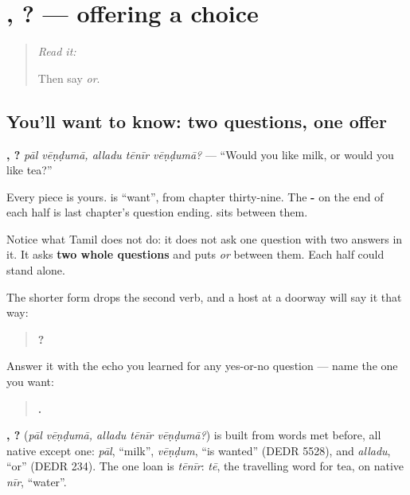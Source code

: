 \section[\texorpdfstring{\ta{பால்} \ta{வேண்டுமா} … (pāl vēṇḍumā …)}{பால் வேண்டுமா … (pāl vēṇḍumā …)}]{ ,   ? — offering a choice}

\label{lesson:TA-C76-choice}



\begin{quote}
\emph{Read it:} \textbf{}

Then say \emph{or}.
\end{quote}

\subsection*{You'll want to know: two questions, one offer}
\textbf{ ,   ?} \emph{pāl vēṇḍumā, alladu tēnīr vēṇḍumā?} — \textquotedblleft{}Would you like milk, or would you like tea?\textquotedblright{}

Every piece is yours.  is \textquotedblleft{}want\textquotedblright{}, from chapter thirty-nine. The \textbf{-} on the end of each half is last chapter's question ending.  sits between them.

Notice what Tamil does not do: it does not ask one question with two answers in it. It asks \textbf{two whole questions} and puts \emph{or} between them. Each half could stand alone.

The shorter form drops the second verb, and a host at a doorway will say it that way:

\begin{quote}
\textbf{  ?}
\end{quote}

Answer it with the echo you learned for any yes-or-no question — name the one you want:

\begin{quote}
\textbf{.}
\end{quote}

\begin{cousinweb}
\textbf{ ,   ?} (\emph{pāl vēṇḍumā, alladu tēnīr vēṇḍumā?}) is built from words met before, all native except one: \emph{pāl}, \textquotedblleft{}milk\textquotedblright{}, \emph{vēṇḍum}, \textquotedblleft{}is wanted\textquotedblright{} (DEDR 5528), and \emph{alladu}, \textquotedblleft{}or\textquotedblright{} (DEDR 234). The one loan is \emph{tēnīr}: \emph{tē}, the travelling word for tea, on native \emph{nīr}, \textquotedblleft{}water\textquotedblright{}.
\end{cousinweb}

